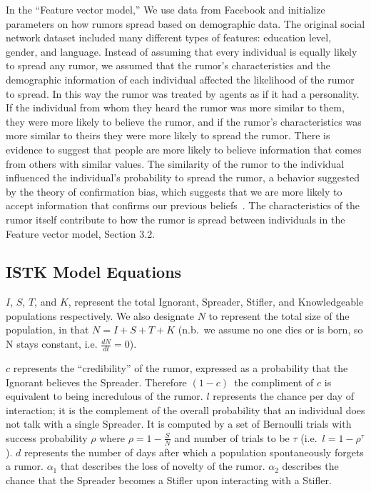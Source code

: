 In the ``Feature vector model,'' We use data from Facebook and initialize parameters on how rumors spread based on demographic data.
The original social network dataset included many different types of features: education level, gender, and language.
Instead of assuming that every individual is equally likely to spread any rumor, we assumed that the rumor's characteristics and the demographic information of each individual affected the likelihood of the rumor to spread.
In this way the rumor was treated by agents as if it had a personality.
If the individual from whom they heard the rumor was more similar to them, they were more likely to believe the rumor, and if the rumor's characteristics was more similar to theirs they were more likely to spread the rumor.
There is evidence to suggest that people are more likely to believe information that comes from others with similar values\cite{gillespie-2004}.
The similarity of the rumor to the individual influenced the individual's probability to spread the rumor, a behavior suggested by the theory of confirmation bias, which suggests that we are more likely to accept information that confirms our previous beliefs~\cite{wason-1960}.
The characteristics of the rumor itself contribute to how the rumor is spread between individuals in the Feature vector model, Section $3.2$.

\subsection{ISTK Model Equations}
\label{subsec:istkeqns}

\noindent $ I $, $ S $, $ T $, and $ K $, represent the total Ignorant, Spreader, Stifler, and Knowledgeable populations respectively.
We also designate $ N $ to represent the total size of the population, in that $ N = I + S + T + K $ (n.b.\ we assume no one dies or is born, so N stays constant, i.e. $\frac{dN}{dt} = 0$).

$ c $ represents the ``credibility'' of the rumor, expressed as a probability that the Ignorant believes the Spreader.
Therefore $ (1 - c) $\, the compliment of $ c $ is equivalent to being incredulous of the rumor.
$ l $ represents the chance per day of interaction; it is the complement of the overall probability that an individual does not talk with a single Spreader.
It is computed by a set of Bernoulli trials with success probability $ \rho $ where $ \rho = 1 - \frac{S}{N} $ and number of trials to be $ \tau $ (i.e.~$ l = 1 - \rho^\tau $).
$ d $ represents the number of days after which a population spontaneously forgets a rumor.
$\alpha_1$ that describes the loss of novelty of the rumor.
$ \alpha_2 $ describes the chance that the Spreader becomes a Stifler upon interacting with a Stifler.

